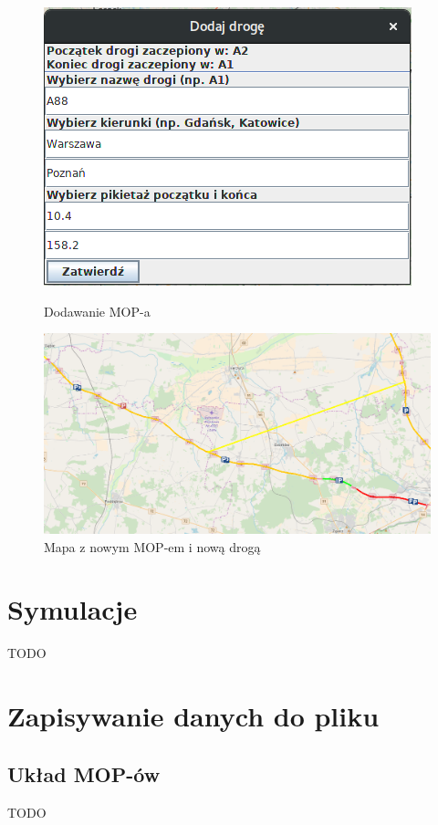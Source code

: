 \documentclass[10pt,paper=a4 BCOR0, DIV15, titlepage=false, oneside]{scrbook} %
\begin{document}
     \begin{figure}[ht]
       \begin{minipage}{.3\textwidth}
        \centering
       \includegraphics[width=.9\linewidth]{dodawanie_drogi.png}
        \caption{Dodawanie MOP-a}
      \end{minipage}%
      \begin{minipage}{.6\textwidth}
        \centering
       \includegraphics[width=.9\linewidth]{dodany_mop_droga.png}
        \caption{Mapa z nowym MOP-em i nową drogą}
      \end{minipage}
      \end{figure}


    \chapter*{Symulacje}
    \addtocounter{chapter}{1}
    \setcounter{section}{0}
    TODO

    \chapter*{Zapisywanie danych do pliku}
    \addtocounter{chapter}{1}
    \setcounter{section}{0}

    \section{Układ MOP-ów}
    TODO

  
\end{document}
